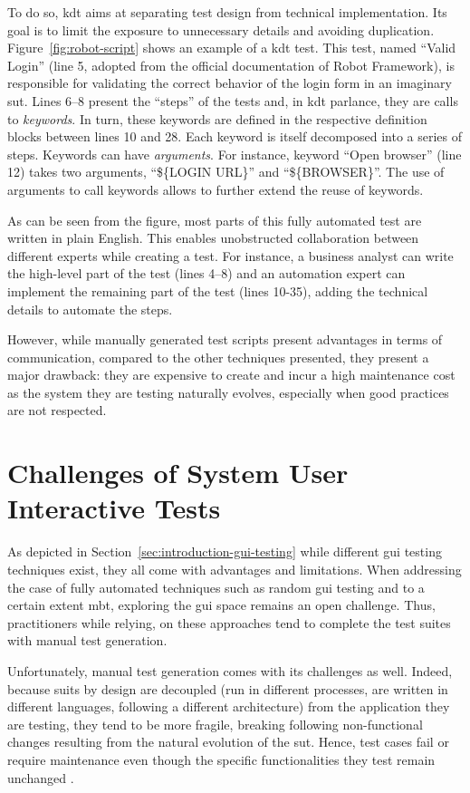 To do so, \gls{kdt} \cite{Tang2008, Hametner2012} aims at separating test design from technical implementation. Its goal is to limit the exposure to unnecessary details and avoiding duplication. Figure~\ref{fig:robot-script} shows an example of a \gls{kdt} test. This test, named ``Valid Login'' (line 5, adopted from the official documentation of Robot Framework), is responsible for validating the correct behavior of the login form in an imaginary \gls{sut}. Lines 6--8 present the ``steps'' of the tests and, in \gls{kdt} parlance, they are calls to \emph{keywords}. In turn, these keywords are defined in the respective definition blocks between lines 10 and 28. Each keyword is itself decomposed into a series of steps. Keywords can have \emph{arguments}. For instance, keyword ``Open browser'' (line 12) takes two arguments, ``\$\{LOGIN URL\}'' and ``\$\{BROWSER\}''. The use of arguments to call keywords allows to further extend the reuse of keywords.

As can be seen from the figure, most parts of this fully automated test are written in plain English. This enables unobstructed collaboration between different experts while creating a test. For instance, a business analyst can write the high-level part of the test (lines 4--8) and an automation expert can implement the remaining part of the test (lines 10-35), adding the technical details to automate the steps.

However, while manually generated test scripts present advantages in terms of communication, compared to the other techniques presented, they present a major drawback: they are expensive to create and incur a high maintenance cost as the system they are testing naturally evolves, especially when good practices are not respected.

\section{Challenges of System User Interactive Tests}

As depicted in Section~\ref{sec:introduction-gui-testing} while different \gls{gui} testing techniques exist, they all come with advantages and limitations. When addressing the case of fully automated techniques such as random \gls{gui} testing and to a certain extent \gls{mbt}, exploring the \gls{gui} space remains an open challenge. Thus, practitioners while relying, on these approaches tend to complete the test suites with manual test generation.

Unfortunately, manual test generation comes with its challenges as well. Indeed, because \gls{suit}s by design are decoupled (\eg run in different processes, are written in different languages, following a different architecture) from the application they are testing, they tend to be more fragile, \ie breaking following non-functional changes resulting from the natural evolution of the \gls{sut}. Hence, test cases fail or require maintenance even though the specific functionalities they test remain unchanged \cite{Coppola2019, DiMartino2021}.

